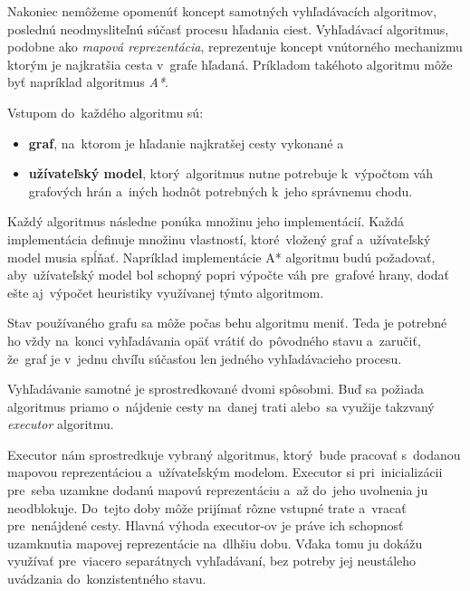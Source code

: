 Nakoniec nemôžeme opomenúť koncept samotných vyhľadávacích algoritmov, poslednú neodmysliteľnú súčasť procesu hľadania ciest. Vyhľadávací algoritmus, podobne ako \textit{mapová reprezentácia}, reprezentuje koncept vnútorného mechanizmu ktorým je najkratšia cesta v~grafe hľadaná. Príkladom takéhoto algoritmu môže byť napríklad algoritmus \textit{A*}. 

Vstupom do~každého algoritmu sú:
\begin{itemize}
    \item \textbf{graf}, na~ktorom je hľadanie najkratšej cesty vykonané a~
    \item \textbf{užívateľský model}, ktorý~algoritmus nutne potrebuje k~výpočtom váh grafových hrán a~iných hodnôt potrebných k~jeho správnemu chodu.  
\end{itemize}

Každý algoritmus následne ponúka množinu jeho implementácií. Každá implementácia definuje množinu vlastností, ktoré~vložený graf a~užívateľský model musia spĺňať. Napríklad implementácie A* algoritmu budú požadovať, aby~užívateľský model bol schopný popri výpočte váh pre~grafové hrany, dodať ešte aj~výpočet heuristiky využívanej týmto algoritmom.

Stav používaného grafu sa môže počas behu algoritmu meniť. Teda je potrebné ho vždy na~konci vyhľadávania opäť vrátiť do~pôvodného stavu a~zaručiť, že~graf je v~jednu chvíľu súčasťou len jedného vyhľadávacieho procesu.

Vyhľadávanie samotné je sprostredkované dvomi spôsobmi. Buď sa požiada algoritmus priamo o~nájdenie cesty na~danej trati alebo~sa využije takzvaný \textit{executor} algoritmu. 

Executor nám sprostredkuje vybraný algoritmus, ktorý~bude pracovať s~dodanou mapovou reprezentáciou a~užívateľským modelom. Executor si pri~inicializácii pre~seba uzamkne dodanú mapovú reprezentáciu a~až do~jeho uvolnenia ju neodblokuje. Do~tejto doby môže prijímať rôzne vstupné trate a~vracať pre~nenájdené cesty. Hlavná výhoda executor-ov je práve ich schopnosť uzamknutia mapovej reprezentácie na~dlhšiu dobu. Vďaka tomu ju dokážu využívať pre~viacero separátnych vyhľadávaní, bez potreby jej neustáleho uvádzania do~konzistentného stavu.  

